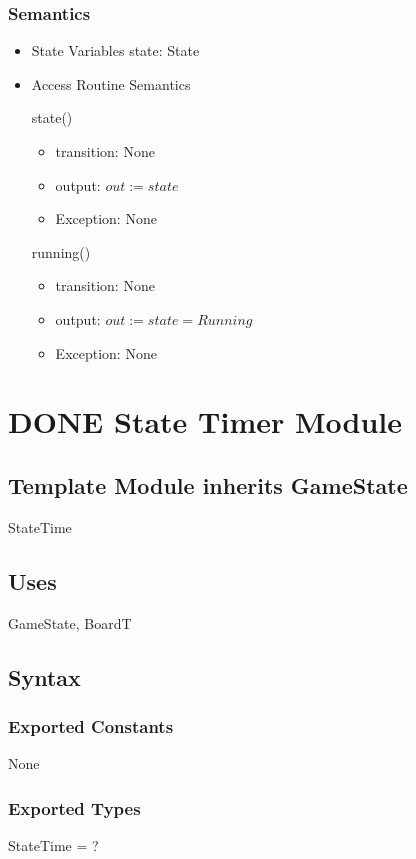 \documentclass[11pt]{article}
\begin{document}
\subsubsection*{Semantics}
\label{sec:org765eba9}
\begin{itemize}
\item State Variables
\label{sec:org487f9f2}
state: State

\item Access Routine Semantics
\label{sec:org1982925}

state()
\begin{itemize}
\item transition: None
\item output: \(out := state\)
\item Exception: None
\end{itemize}

running()
\begin{itemize}
\item transition: None
\item output: \(out := state = Running\)
\item Exception: None
\end{itemize}

\newpage
\end{itemize}
\section{{\bfseries\sffamily DONE} State Timer Module}
\label{sec:org951f248}
\subsection*{Template Module inherits GameState}
\label{sec:org9f7c39b}
StateTime

\subsection*{Uses}
\label{sec:org105f8b4}
GameState, BoardT

\subsection*{Syntax}
\label{sec:orgc650dba}
\subsubsection*{Exported Constants}
\label{sec:org894de57}
None

\subsubsection*{Exported Types}
\label{sec:org4faf3fd}
StateTime = ?
\end{document}

